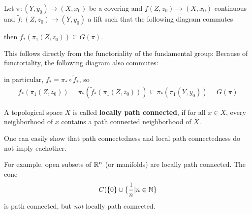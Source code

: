 \begin{rem}[]
  Let $\pi:(Y,y_0) \to (X,x_0)$ be a covering and $f(Z,z_0) \to (X,x_0)$ continuous and $\tilde{f}:(Z,z_0) \to (Y,y_0)$ a lift such that the following diagram commutes
  \begin{center}
  \end{center}
  then $f_{\ast}(\pi_1(Z,z_0)) \subseteq G(\pi)$.

  This follows directly from the functoriality of the fundamental group:
  Because of functoriality, the following diagram also commutes:
  \begin{center}
  \end{center}
  in particular, $f_{\ast} = \pi_{\ast} \circ \tilde{f}_{\ast}$, so 
  \begin{align*}
    f_{\ast}(\pi_1(Z,z_0)) = \pi_{\ast}(\tilde{f}_{\ast}(\pi_1(Z,z_0))) \subseteq \pi_{\ast}(\pi_1(Y,y_0)) = G(\pi)
  \end{align*}
\end{rem}



\begin{dfn}[]
  A topological space $X$ is called \textbf{locally path connected}, if for all $x \in X$, every neighborhood of $x$ contains a path connected neighborhood of $X$.
\end{dfn}
One can easily show that path connectedness and local path connectedness do not imply eachother.
\begin{ex}[]
  For example. open subsets of $\mathbb{R}^{n}$ (or manifolds) are locally path connected.
  The cone 
  \begin{align*}
    C(\{0\} \cup \{\frac{1}{n}|n \in \mathbb{N}\}
  \end{align*}
  is path connected, but \emph{not} locally path connected.

\end{ex}


